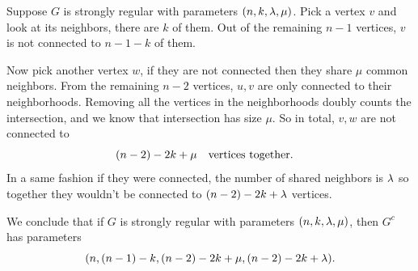 \documentclass[12pt]{memoir}
\begin{document}
\begin{ptcbr}
    Suppose $G$ is strongly regular with parameters $(n,k,\lambda,\mu)$. Pick a vertex $v$ and look at its neighbors, there are $k$ of them. Out of the remaining $n-1$ vertices, $v$ is not connected to $n-1-k$ of them.\par 
    Now pick another vertex $w$, if they are not connected then they share $\mu$ common neighbors. From the remaining $n-2$ vertices, $u,v$ are only connected to their neighborhoods. Removing all the vertices in the neighborhoods doubly counts the intersection, and we know that intersection has size $\mu$. So in total, $v,w$ are not connected to  
    $$(n-2)-2k+\mu\quad\text{vertices together.}\quad$$
    In a same fashion if they were connected, the number of shared neighbors is $\lambda$ so together they wouldn't be connected to $(n-2)-2k+\lambda$ vertices.\par 
    We conclude that if $G$ is strongly regular with parameters $(n,k,\lambda,\mu)$, then $G^c$ has parameters 
    $$(n,(n-1)-k,(n-2)-2k+\mu,(n-2)-2k+\lambda).$$
\end{ptcbr}
\end{document}
